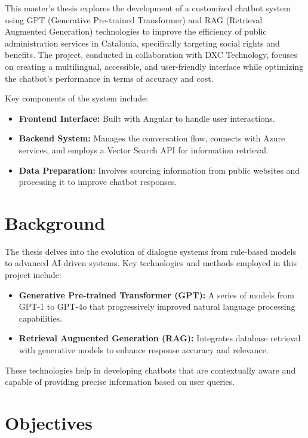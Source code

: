 \documentclass[a4paper,12pt,oneside]{ThesisStyle}
\begin{document}
This master's thesis explores the development of a customized chatbot system using GPT (Generative Pre-trained Transformer) and RAG (Retrieval Augmented Generation) technologies to improve the efficiency of public administration services in Catalonia, specifically targeting social rights and benefits. The project, conducted in collaboration with DXC Technology, focuses on creating a multilingual, accessible, and user-friendly interface while optimizing the chatbot's performance in terms of accuracy and cost.

Key components of the system include:

\begin{itemize}
    \item \textbf{Frontend Interface:} Built with Angular to handle user interactions.
    \item \textbf{Backend System:} Manages the conversation flow, connects with Azure services, and employs a Vector Search API for information retrieval.
    \item \textbf{Data Preparation:} Involves sourcing information from public websites and processing it to improve chatbot responses.
\end{itemize}

\section{Background}
\label{sec:background}

The thesis delves into the evolution of dialogue systems from rule-based models to advanced AI-driven systems. Key technologies and methods employed in this project include:

\begin{itemize}
    \item \textbf{Generative Pre-trained Transformer (GPT):} A series of models from GPT-1 to GPT-4o that progressively improved natural language processing capabilities.
    \item \textbf{Retrieval Augmented Generation (RAG):} Integrates database retrieval with generative models to enhance response accuracy and relevance.
\end{itemize}

These technologies help in developing chatbots that are contextually aware and capable of providing precise information based on user queries.

\section{Objectives}
\label{sec:objectives}
\end{document}
